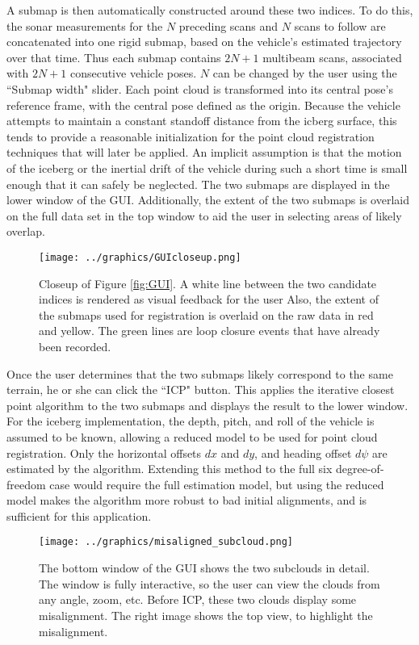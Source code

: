 A submap is then automatically constructed around these two indices. To do this, the sonar measurements for the $N$ preceding scans and $N$ scans to follow are concatenated into one rigid submap, based on the vehicle's estimated trajectory over that time. Thus each submap contains $2N+1$ multibeam scans, associated with $2N+1$ consecutive vehicle poses. $N$ can be changed by the user using the ``Submap width" slider. Each point cloud is transformed into its central pose's reference frame, with the central pose defined as the origin. Because the vehicle attempts to maintain a constant standoff distance from the icberg surface, this tends to provide a reasonable initialization for the point cloud registration techniques that will later be applied. An implicit assumption is that the motion of the iceberg or the inertial drift of the vehicle during such a short time is small enough that it can safely be neglected. The two submaps are displayed in the lower window of the GUI. Additionally, the extent of the two submaps is overlaid on the full data set in the top window to aid the user in selecting areas of likely overlap.

 \begin{figure}[htbp]
   \centering
   \texttt{[image: ../graphics/GUIcloseup.png]} %
   \caption{Closeup of Figure \ref{fig:GUI}. A white line between the two candidate indices is rendered as visual feedback for the user Also, the extent of the submaps used for registration is overlaid on the raw data in red and yellow. The green lines are loop closure events that have already been recorded.}
   \label{fig:GUIcloseup}
\end{figure}

Once the user determines that the two submaps likely correspond to the same terrain, he or she can click the ``ICP" button. This applies the iterative closest point algorithm to the two submaps and displays the result to the lower window. For the iceberg implementation, the depth, pitch, and roll of the vehicle is assumed to be known, allowing a reduced model to be used for point cloud registration. Only the horizontal offsets $dx$ and $dy$, and heading offset $d\psi$ are estimated by the algorithm. Extending this method to the full six degree-of-freedom case would require the full estimation model, but using the reduced model makes the algorithm more robust to bad initial alignments, and is sufficient for this application. 
 
 \begin{figure}[htbp]
   \centering
   \texttt{[image: ../graphics/misaligned\_subcloud.png]} %
   \caption{The bottom window of the GUI shows the two subclouds in detail. The window is fully interactive, so the user can view the clouds from any angle, zoom, etc. Before ICP, these two clouds display some misalignment. The right image shows the top view, to highlight the misalignment.}
   \label{fig:GUI_preicp}
\end{figure}

